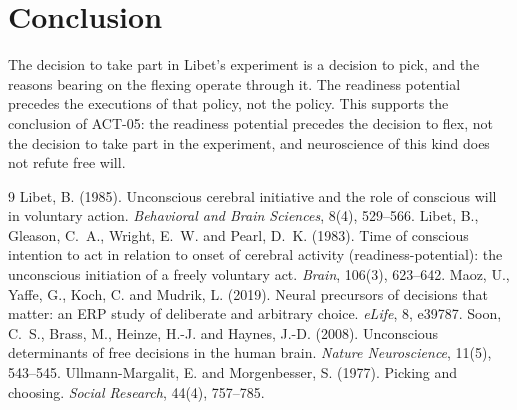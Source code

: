 \documentclass{situationist-preprint}
\begin{document}
\section{Conclusion}

The decision to take part in Libet's experiment is a decision to pick, and the reasons bearing on the flexing operate through it. The readiness potential precedes the executions of that policy, not the policy. This supports the conclusion of ACT-05: the readiness potential precedes the decision to flex, not the decision to take part in the experiment, and neuroscience of this kind does not refute free will.

\begin{thebibliography}{9}
 Libet, B. (1985). Unconscious cerebral initiative and the role of conscious will in voluntary action. \emph{Behavioral and Brain Sciences}, 8(4), 529--566.
 Libet, B., Gleason, C.~A., Wright, E.~W. and Pearl, D.~K. (1983). Time of conscious intention to act in relation to onset of cerebral activity (readiness-potential): the unconscious initiation of a freely voluntary act. \emph{Brain}, 106(3), 623--642.
 Maoz, U., Yaffe, G., Koch, C. and Mudrik, L. (2019). Neural precursors of decisions that matter: an ERP study of deliberate and arbitrary choice. \emph{eLife}, 8, e39787.
 Soon, C.~S., Brass, M., Heinze, H.-J. and Haynes, J.-D. (2008). Unconscious determinants of free decisions in the human brain. \emph{Nature Neuroscience}, 11(5), 543--545.
 Ullmann-Margalit, E. and Morgenbesser, S. (1977). Picking and choosing. \emph{Social Research}, 44(4), 757--785.
\end{thebibliography}
\end{document}
